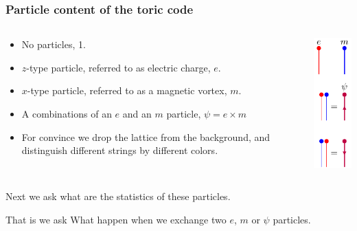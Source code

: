 \documentclass{beamer}
\renewcommand{\(}{\left(}
\renewcommand{\)}{\right)}
\renewcommand{\[}{\left[}
\renewcommand{\]}{\right]}
\begin{document}
\begin{frame}
    \frametitle{Particle content of the toric code}
    \begin{columns}
        \begin{column}{0.85\textwidth}
            \begin{itemize}
                \item No particles, 1.
                \item $z$-type particle, referred to as electric charge, $e$.
                \item $x$-type particle, referred to as a magnetic vortex, $m$.
                \item A combinations of an $e$ and an $m$ particle, $\psi = e \times m$
                \item For convince we drop the lattice from the background, and distinguish different strings by different colors.
            \end{itemize}
        \end{column}
    \begin{column}{0.15\textwidth}
        \centering
        \includegraphics[scale=1]{kinds_of_particles.pdf}
    \end{column}
    \end{columns}
    \pause
    \vspace{10pt}
    Next we ask what are the statistics of these particles. 

    That is we ask What happen when we exchange two $e$, $m$ or $\psi$ particles. 
\end{frame}
\end{document}
